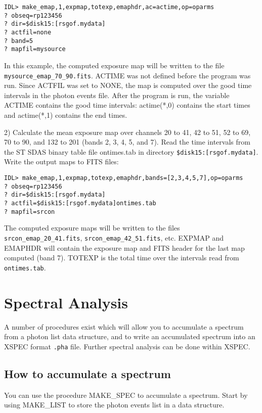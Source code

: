 \medskip\noindent
\begin{verbatim}
IDL> make_emap,1,expmap,totexp,emaphdr,ac=actime,op=oparms
? obseq=rp123456
? dir=$disk15:[rsgof.mydata]
? actfil=none
? band=5
? mapfil=mysource
\end{verbatim}
In this example, the computed exposure map will be written to the file
{\tt mysource{\_}emap{\_}70{\_}90.fits}. ACTIME was not defined before the program was
run. Since ACTFIL was set to NONE, the map is computed over the good time
intervals in the photon events file. After the program is run, the variable
ACTIME contains the good time intervals: actime(*,0) contains the start
times and actime(*,1) contains the end times.
 
2) Calculate the mean exposure map over channels 20 to 41, 42 to 51, 52 to
69, 70 to 90, and 132 to 201 (bands 2, 3, 4, 5, and 7). Read the time
intervals from the ST SDAS binary table file ontimes.tab in directory
{\tt \$disk15:[rsgof.mydata]}. Write the output maps to FITS files:

\medskip\noindent
\begin{verbatim}
IDL> make_emap,1,expmap,totexp,emaphdr,bands=[2,3,4,5,7],op=oparms
? obseq=rp123456
? dir=$disk15:[rsgof.mydata]
? actfil=$disk15:[rsgof.mydata]ontimes.tab
? mapfil=srcon
\end{verbatim}
The computed exposure maps will be written to the files {\tt srcon{\_}emap{\_}20{\_}41.fits},
{\tt srcon{\_}emap{\_}42{\_}51.fits}, etc. EXPMAP and EMAPHDR will contain the exposure
map and FITS header for the last map computed (band 7). TOTEXP is the total
time over the intervals read from {\tt ontimes.tab}.
 

\section{Spectral Analysis}
 
A number of procedures exist which will allow you to accumulate a spectrum from
a photon list data structure, and to write an accumulated spectrum into an
XSPEC format {\tt .pha} file. Further spectral analysis can be done within XSPEC.
 

\subsection{How to accumulate a spectrum}
 
You can use the procedure MAKE{\_}SPEC to accumulate a spectrum. Start by using
MAKE{\_}LIST to store the photon events list in a data structure.

